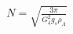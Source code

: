 \documentclass[preview]{standalone}
\begin{document}
\begin{align*}
N= \sqrt{\frac{3 \pi}{G_{4}^{2} g_{s} \rho_{\Lambda}}}
\end{align*}
\end{document}
